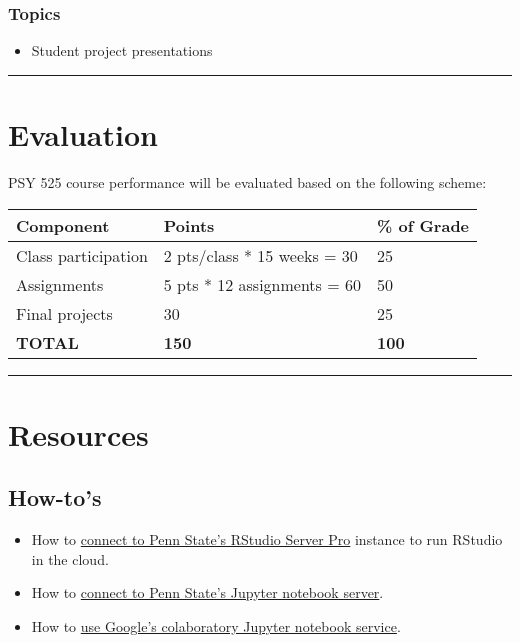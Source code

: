 \documentclass[
]{article}
\providecommand{\tightlist}{%
  \setlength{\itemsep}{0pt}\setlength{\parskip}{0pt}}
\begin{document}
\hypertarget{topics-14}{%
\subsubsection{Topics}\label{topics-14}}

\begin{itemize}
\tightlist
\item
  Student project presentations
\end{itemize}

\begin{center}\rule{0.5\linewidth}{0.5pt}\end{center}

\hypertarget{evaluation}{%
\section{Evaluation}\label{evaluation}}

PSY 525 course performance will be evaluated based on the following
scheme:

\begin{longtable}[]{@{}lll@{}}
\toprule
Component & Points & \% of Grade\tabularnewline
\midrule
\endhead
Class participation & 2 pts/class * 15 weeks = 30 & 25\tabularnewline
Assignments & 5 pts * 12 assignments = 60 & 50\tabularnewline
Final projects & 30 & 25\tabularnewline
\textbf{TOTAL} & \textbf{150} & \textbf{100}\tabularnewline
\bottomrule
\end{longtable}

\begin{center}\rule{0.5\linewidth}{0.5pt}\end{center}

\hypertarget{resources-1}{%
\section{Resources}\label{resources-1}}

\hypertarget{how-tos}{%
\subsection{How-to's}\label{how-tos}}

\begin{itemize}
\tightlist
\item
  How to \href{how_to/rstudio-server-pro.html}{connect to Penn State's
  RStudio Server Pro} instance to run RStudio in the cloud.
\item
  How to \href{how_to/jupyter-notebooks-psu.html}{connect to Penn
  State's Jupyter notebook server}.
\item
  How to \href{how_to/google-colaboratory.html}{use Google's
  colaboratory Jupyter notebook service}.
\end{itemize}
\end{document}

